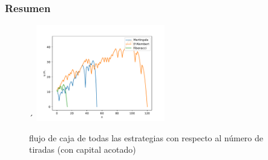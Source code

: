 \documentclass{article}
\begin{document}
  \subsubsection{Resumen}
  \begin{figure}[H]´
    \centering
    \includegraphics[width=0.5\textwidth]{generated/capital-acotado.pdf}
    \caption{flujo de caja de todas las estrategias con respecto al número de tiradas (con capital acotado)}
  \end{figure}
\end{document}
